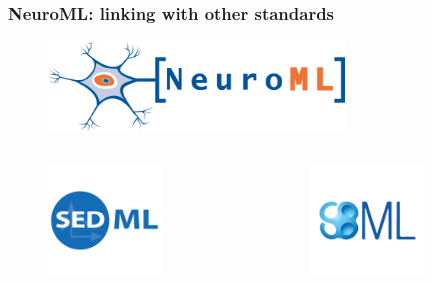 \begin{frame}[c]
  \frametitle{NeuroML: linking with other standards}
  \begin{figure}[h]
    \centering
    \includegraphics[width=0.7\textwidth]{99_images/neuroml-logo}\\\vspace{0.2cm}
  \end{figure}%
  \begin{columns}
    \begin{column}{0.5\textwidth}
      \begin{figure}[h]
        \centering
        \includegraphics[width=0.7\textwidth]{99_images/sedml}\\\vspace{0.2cm}
      \end{figure}%
    \end{column}
    \begin{column}{0.5\textwidth}
      \begin{figure}[h]
        \centering
        \includegraphics[width=0.7\textwidth]{99_images/sbml}

\end{figure}
\end{column}
\end{columns}
\end{frame}
